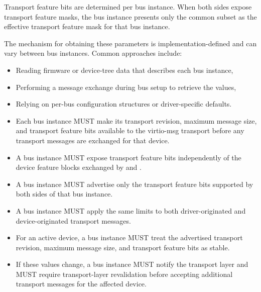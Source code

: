 Transport feature bits are determined per bus instance. When both sides expose
transport feature masks, the bus instance presents only the common subset as
the effective transport feature mask for that bus instance.

The mechanism for obtaining these parameters is implementation-defined and can
vary between bus instances. Common approaches include:
\begin{itemize}
  \item Reading firmware or device-tree data that describes each bus instance,
  \item Performing a message exchange during bus setup to retrieve the values,
  \item Relying on per-bus configuration structures or driver-specific defaults.
\end{itemize}

\begin{itemize}
  \item Each bus instance MUST make its transport revision, maximum message
        size, and transport feature bits available to the virtio-msg transport
        before any transport messages are exchanged for that device.
  \item A bus instance MUST expose transport feature bits independently of the
        device feature blocks exchanged by  and
        .
  \item A bus instance MUST advertise only the transport feature bits supported
        by both sides of that bus instance.
  \item A bus instance MUST apply the same limits to both driver-originated and
        device-originated transport messages.
  \item For an active device, a bus instance MUST treat the advertised
        transport revision, maximum message size, and transport feature bits as
        stable.
  \item If these values change, a bus instance MUST notify the transport layer
        and MUST require transport-layer revalidation before accepting
        additional transport messages for the affected device.
\end{itemize}


